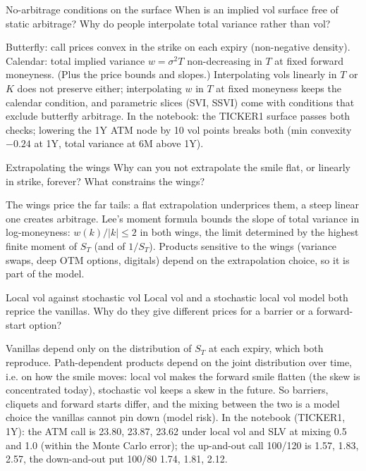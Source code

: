 \begin{question}{\Theory \Practice {}}{No-arbitrage conditions on the surface}
When is an implied vol surface free of static arbitrage? Why do people interpolate total variance rather than vol?
\end{question}
\begin{answer}
Butterfly: call prices convex in the strike on each expiry (non-negative density). Calendar: total implied variance
$w = \sigma^2T$ non-decreasing in $T$ at fixed forward moneyness. (Plus the price bounds and slopes.) Interpolating
vols linearly in $T$ or $K$ does not preserve either; interpolating $w$ in $T$ at fixed moneyness keeps the calendar
condition, and parametric slices (SVI, SSVI) come with conditions that exclude butterfly arbitrage. In the notebook:
the TICKER1 surface passes both checks; lowering the 1Y ATM node by 10 vol points breaks both (min convexity $-0.24$
at 1Y, total variance at 6M above 1Y).
\end{answer}

\begin{question}{\Theory {}}{Extrapolating the wings}
Why can you not extrapolate the smile flat, or linearly in strike, forever? What constrains the wings?
\end{question}
\begin{answer}
The wings price the far tails: a flat extrapolation underprices them, a steep linear one creates arbitrage. Lee's
moment formula bounds the slope of total variance in log-moneyness: $w(k)/|k| \le 2$ in both wings, the limit
determined by the highest finite moment of $S_T$ (and of $1/S_T$). Products sensitive to the wings (variance swaps,
deep OTM options, digitals) depend on the extrapolation choice, so it is part of the model.
\end{answer}

\begin{question}{\Theory \Practice {}}{Local vol against stochastic vol}
Local vol and a stochastic local vol model both reprice the vanillas. Why do they give different prices for a barrier
or a forward-start option?
\end{question}
\begin{answer}
Vanillas depend only on the distribution of $S_T$ at each expiry, which both reproduce. Path-dependent products depend
on the joint distribution over time, i.e. on how the smile moves: local vol makes the forward smile flatten (the skew
is concentrated today), stochastic vol keeps a skew in the future. So barriers, cliquets and forward starts differ,
and the mixing between the two is a model choice the vanillas cannot pin down (model risk). In the notebook (TICKER1,
1Y): the ATM call is 23.80, 23.87, 23.62 under local vol and SLV at mixing 0.5 and 1.0 (within the Monte Carlo
error); the up-and-out call 100/120 is 1.57, 1.83, 2.57, the down-and-out put 100/80 1.74, 1.81, 2.12.
\end{answer}

